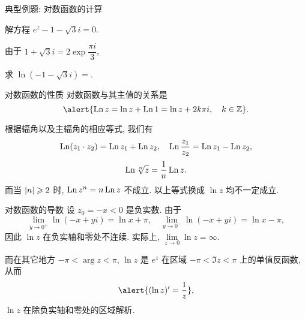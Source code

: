 \begin{frame}[<*>]{典型例题: 对数函数的计算}
\onslide<+->
\begin{example}
解方程 $e^z-1-\sqrt 3i=0$.
\end{example}
\onslide<+->
\begin{solution}
由于 $1+\sqrt 3 i=2\exp\dfrac{\pi i}3$,
\vspace{-\baselineskip}
\end{solution}
\onslide<+->
\begin{exercise}
求 $\ln(-1-\sqrt3 i)=$.
\end{exercise}
\end{frame}


\begin{frame}{对数函数的性质}
\onslide<+->
对数函数与其主值的关系是
\[\alert{\Ln z=\ln z+\Ln 1=\ln z+2k\pi i,\quad k\in\BZ}.\]

\onslide<+->
根据辐角以及主辐角的相应等式, 我们有
\[\operatorname{Ln}(z_1\cdot z_2)=\operatorname{Ln} z_1+\operatorname{Ln} z_2,\quad
\operatorname{Ln}\frac{z_1}{z_2}=\operatorname{Ln} z_1-\operatorname{Ln} z_2,\]
\[\operatorname{Ln} \sqrt[n]z=\dfrac1n\operatorname{Ln} z.\]
\onslide<+->
而当 $\left|n\right|\geqslant 2$ 时, \alert{$\operatorname{Ln} z^n=n\operatorname{Ln} z$ 不成立}.
\onslide<+->
以上等式换成 $\ln z$ 均不一定成立.
\end{frame}


\begin{frame}{对数函数的导数}
\onslide<+->
设 $z_0=-x<0$ 是负实数.
\onslide<+->
由于
\[\lim_{y\to0^+}\ln (-x+yi)=\ln x+\pi,\quad
\lim_{y\to0^-}\ln (-x+yi)=\ln x-\pi,\]
\onslide<+->
因此 $\ln z$ 在负实轴和零处不连续.
\onslide<+->
实际上, $\lim\limits_{z\to 0}\ln z=\infty$.

\onslide<+->
而在其它地方 $-\pi<\arg z<\pi$, $\ln z$ 是 $e^z$ 在区域 $-\pi<\Im z<\pi$ 上的单值反函数, 
\onslide<+->
从而
\[\alert{(\ln z)'=\frac 1z},\]
\alert{$\ln z$ 在除负实轴和零处的区域解析}.
\end{frame}


